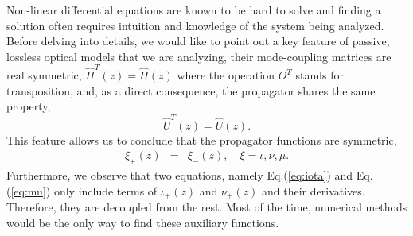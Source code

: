 \documentclass[9pt,twocolumn,twoside]{osajnl}
\begin{document}
Non-linear differential equations are known to be hard to solve and finding a solution 
often requires intuition and knowledge of the system being analyzed. 
Before delving into details, we would like to point out a key feature of passive, lossless optical models that we are analyzing, their mode-coupling matrices are real symmetric, $\hat{H}^{T}(z) = \hat{H}(z)$ where the operation $O^{T}$ stands for transposition,  and, as a direct consequence, the propagator shares the same property,
\begin{equation}  
	\hat{U}^{T}(z)=\hat{U}(z).
\end{equation} 
This feature allows us to conclude that the propagator functions are symmetric,
\begin{eqnarray}
	\xi_{+}(z)&=&\xi_{-}(z), \quad \xi = \iota, \nu, \mu.
\end{eqnarray}
Furthermore, we observe that two equations, namely Eq.(\ref{eq:iota}) and Eq.(\ref{eq:mu}) only include terms of $\iota_{+}(z)$ and $\nu_{+}(z)$ and their derivatives. 
Therefore, they are decoupled from the rest. 
Most of the time, numerical methods would be the only way to find these auxiliary functions.
\end{document}
